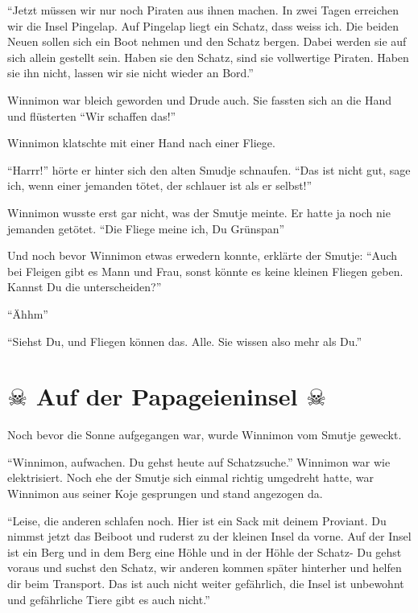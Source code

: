 \enquote{Jetzt müssen wir nur noch Piraten aus ihnen machen. In zwei Tagen erreichen wir die Insel Pingelap. Auf Pingelap liegt ein Schatz, dass weiss ich. Die beiden Neuen sollen sich ein Boot nehmen und den Schatz bergen. Dabei werden sie auf sich allein gestellt sein. Haben sie den Schatz, sind sie vollwertige Piraten. Haben sie ihn nicht, lassen wir sie nicht wieder an Bord.}

Winnimon war bleich geworden und Drude auch. Sie fassten sich an die Hand und flüsterten \enquote{Wir schaffen das!}







Winnimon klatschte mit einer Hand nach einer Fliege. 

\enquote{Harrr!} hörte er hinter sich den alten Smudje schnaufen. ``Das ist nicht gut, sage ich, wenn einer jemanden tötet, der schlauer ist als er selbst!''

Winnimon wusste erst gar nicht, was der Smutje meinte. Er hatte ja noch nie jemanden getötet. ``Die Fliege meine ich, Du Grünspan''

Und noch bevor Winnimon etwas erwedern konnte, erklärte der Smutje: ``Auch bei Fleigen gibt es Mann und Frau, sonst könnte es keine kleinen Fliegen geben. Kannst Du die unterscheiden?'' 

``Ähhm''

``Siehst Du, und Fliegen können das. Alle. Sie wissen also mehr als Du.''



\section*{\center $\skull$ Auf der Papageieninsel $\skull$}
Noch bevor die Sonne aufgegangen war, wurde Winnimon vom Smutje geweckt.

\enquote{Winnimon, aufwachen. Du gehst heute auf Schatzsuche.} Winnimon war wie elektrisiert. Noch ehe der Smutje sich einmal richtig umgedreht hatte, war Winnimon aus seiner Koje gesprungen und stand angezogen da.

\enquote{Leise, die anderen schlafen noch. Hier ist ein Sack mit deinem Proviant. Du nimmst jetzt das Beiboot und ruderst zu der kleinen Insel da vorne. Auf der Insel ist ein Berg und in dem Berg eine Höhle und in der Höhle der Schatz- Du gehst voraus und suchst den Schatz, wir anderen kommen später hinterher und helfen dir beim Transport. Das ist auch nicht weiter gefährlich, die Insel ist unbewohnt und gefährliche Tiere gibt es auch nicht.}

